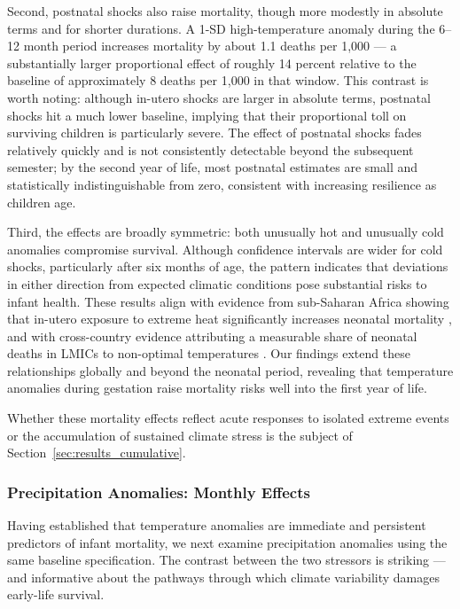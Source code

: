\documentclass[a4paper]{article}
\begin{document}
Second, postnatal shocks also raise mortality, though more modestly in absolute terms and for shorter durations. A 1-SD high-temperature anomaly during the 6--12 month period increases mortality by about 1.1 deaths per 1,000 — a substantially larger proportional effect of roughly 14 percent relative to the baseline of approximately 8 deaths per 1,000 in that window. This contrast is worth noting: although in-utero shocks are larger in absolute terms, postnatal shocks hit a much lower baseline, implying that their proportional toll on surviving children is particularly severe. The effect of postnatal shocks fades relatively quickly and is not consistently detectable beyond the subsequent semester; by the second year of life, most postnatal estimates are small and statistically indistinguishable from zero, consistent with increasing resilience as children age.

Third, the effects are broadly symmetric: both unusually hot and unusually cold anomalies compromise survival. Although confidence intervals are wider for cold shocks, particularly after six months of age, the pattern indicates that deviations in either direction from expected climatic conditions pose substantial risks to infant health. These results align with evidence from sub-Saharan Africa showing that in-utero exposure to extreme heat significantly increases neonatal mortality \parencite{wang2025}, and with cross-country evidence attributing a measurable share of neonatal deaths in LMICs to non-optimal temperatures \parencite{dimitrova2024}. Our findings extend these relationships globally and beyond the neonatal period, revealing that temperature anomalies during gestation raise mortality risks well into the first year of life.

Whether these mortality effects reflect acute responses to isolated extreme events or the accumulation of sustained climate stress is the subject of Section~\ref{sec:results_cumulative}.

\subsubsection{Precipitation Anomalies: Monthly Effects}

Having established that temperature anomalies are immediate and persistent predictors of infant mortality, we next examine precipitation anomalies using the same baseline specification. The contrast between the two stressors is striking — and informative about the pathways through which climate variability damages early-life survival.
\end{document}
